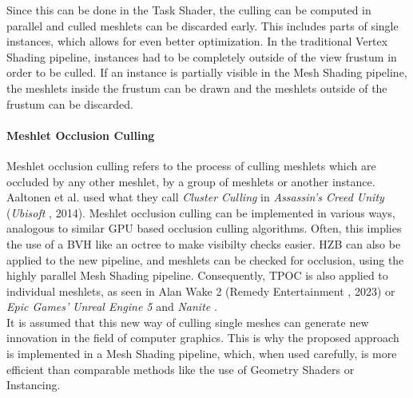 \noindent
Since this can be done in the Task Shader, the culling can be computed in parallel and 
culled meshlets can be discarded early. This includes parts of single instances, which allows for even better 
optimization. In the traditional Vertex Shading pipeline, instances had to be completely outside of the view frustum 
in order to be culled. If an instance is partially visible in the Mesh Shading pipeline, the meshlets inside the 
frustum can be drawn and the meshlets outside of the frustum can be discarded.


\paragraph*{Meshlet Occlusion Culling} \label{subsubsec-meshlet-occlusion-culling}

Meshlet occlusion culling refers to the process of culling meshlets which are occluded by any other meshlet, by a 
group of meshlets or another instance. Aaltonen et al. \cite{Aaltonen2015} used what they call \emph{Cluster Culling} 
in \emph{Assassin's Creed Unity} (\emph{Ubisoft} \cite{Ubisoft2014}, 2014). Meshlet occlusion culling can be 
implemented in various ways, analogous to similar \ac{GPU} based occlusion culling algorithms. Often, this implies 
the use of a \ac{BVH} like an octree to make visibilty checks easier. \ac{HZB} can also be applied to the new pipeline, 
and meshlets can be checked for occlusion, using the highly parallel Mesh Shading pipeline. Consequently, \ac{TPOC} 
is also applied to individual meshlets, as seen in Alan Wake 2 (Remedy Entertainment \cite{Remedy2023}, 2023) or 
\emph{Epic Games'} \emph{Unreal Engine 5} and \emph{Nanite} \cite{Karis2021}.\\

\noindent
It is assumed that this new way of culling single meshes can generate new innovation in the field of computer graphics.
This is why the proposed approach is implemented in a Mesh Shading pipeline, which, when used carefully, is more 
efficient than comparable methods like the use of Geometry Shaders or Instancing.